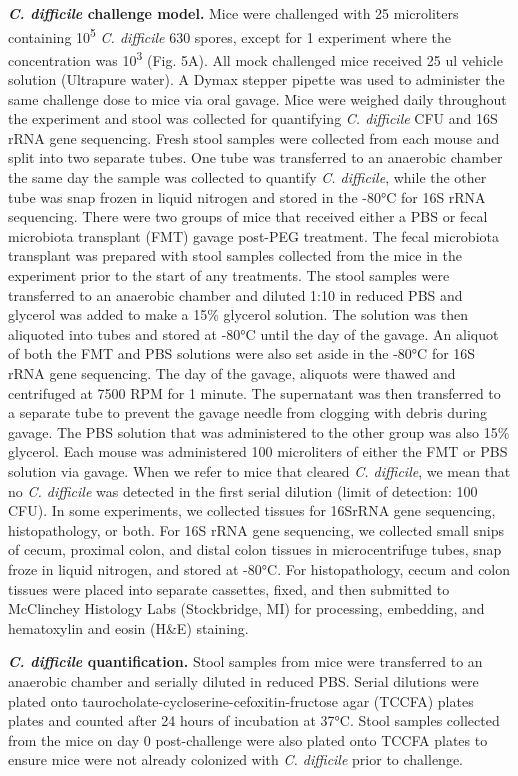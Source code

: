 \documentclass[
  11pt,
]{article}
\begin{document}
\textbf{\emph{C. difficile} challenge model.} Mice were challenged with
25 microliters containing 10\textsuperscript{5} \emph{C. difficile} 630
spores, except for 1 experiment where the concentration was
10\textsuperscript{3} (Fig. 5A). All mock challenged mice received 25 ul
vehicle solution (Ultrapure water). A Dymax stepper pipette was used to
administer the same challenge dose to mice via oral gavage. Mice were
weighed daily throughout the experiment and stool was collected for
quantifying \emph{C. difficile} CFU and 16S rRNA gene sequencing. Fresh
stool samples were collected from each mouse and split into two separate
tubes. One tube was transferred to an anaerobic chamber the same day the
sample was collected to quantify \emph{C. difficile}, while the other
tube was snap frozen in liquid nitrogen and stored in the -80°C for 16S
rRNA sequencing. There were two groups of mice that received either a
PBS or fecal microbiota transplant (FMT) gavage post-PEG treatment. The
fecal microbiota transplant was prepared with stool samples collected
from the mice in the experiment prior to the start of any treatments.
The stool samples were transferred to an anaerobic chamber and diluted
1:10 in reduced PBS and glycerol was added to make a 15\% glycerol
solution. The solution was then aliquoted into tubes and stored at -80°C
until the day of the gavage. An aliquot of both the FMT and PBS
solutions were also set aside in the -80°C for 16S rRNA gene sequencing.
The day of the gavage, aliquots were thawed and centrifuged at 7500 RPM
for 1 minute. The supernatant was then transferred to a separate tube to
prevent the gavage needle from clogging with debris during gavage. The
PBS solution that was administered to the other group was also 15\%
glycerol. Each mouse was administered 100 microliters of either the FMT
or PBS solution via gavage. When we refer to mice that cleared \emph{C.
difficile}, we mean that no \emph{C. difficile} was detected in the
first serial dilution (limit of detection: 100 CFU). In some
experiments, we collected tissues for 16SrRNA gene sequencing,
histopathology, or both. For 16S rRNA gene sequencing, we collected
small snips of cecum, proximal colon, and distal colon tissues in
microcentrifuge tubes, snap froze in liquid nitrogen, and stored at
-80°C. For histopathology, cecum and colon tissues were placed into
separate cassettes, fixed, and then submitted to McClinchey Histology
Labs (Stockbridge, MI) for processing, embedding, and hematoxylin and
eosin (H\&E) staining.

\textbf{\emph{C. difficile} quantification.} Stool samples from mice
were transferred to an anaerobic chamber and serially diluted in reduced
PBS. Serial dilutions were plated onto
taurocholate-cycloserine-cefoxitin-fructose agar (TCCFA) plates plates
and counted after 24 hours of incubation at 37°C. Stool samples
collected from the mice on day 0 post-challenge were also plated onto
TCCFA plates to ensure mice were not already colonized with \emph{C.
difficile} prior to challenge.
\end{document}
